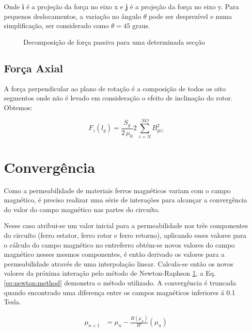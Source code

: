 Onde $\boldsymbol{i}$ é a projeção da força no eixo x e $\boldsymbol{j}$ é a projeção da força no eixo y. Para pequenos deslocamentos, a variação no ângulo $\theta$ pode ser desprezível e numa simplificação, ser considerado como $\theta = 45$ graus.

\begin{figure}[!ht]
	\centering
	
	\caption{Decomposição de força passiva para uma determinada secção}
	\label{fig:Passivo:decomposicao}
\end{figure}

\subsection{Força Axial}

A força perpendicular ao plano de rotação é a composição de todos os oito segmentos onde não é levado em consideração o efeito de inclinação do rotor. Obtemos:

\begin{equation}
F_z(l_g) = \frac{S_{g}}{2 \, \mu_0} 	2 \,\sum_{i=N}^{NO} B_{giz}^2
\end{equation}

\section{Convergência}

Como a permeabilidade de materiais ferros magnéticos variam com o campo magnético, é preciso realizar uma série de interações para alcançar a convergência do valor do campo magnético nas partes do circuíto. 

Nesse caso atribui-se um valor inicial para a permeabilidade nos três componentes do circuíto (ferro estator, ferro rotor e ferro retorno), aplicando esses valores para o cálculo do campo magnético no entreferro obtém-se novos valores do campo magnético nesses mesmos componentes, é então derivado os valores para a permeabilidade através de uma interpolação linear. Calcula-se então os novos valores da próxima interação pelo método de Newton-Raphson \ref{}, a Eq. \ref{eq:newton:method} demonstra o método utilizado. A convergência é truncada quando encontrado uma diferença entre os campos magnéticos inferiores á 0.1 Tesla. 

\begin{align}
	\mu_{n+1} &= \mu_n - \frac{H(\mu_n)}{H'}(\mu_n)
	\label{eq:newton:method}
\end{align} 



